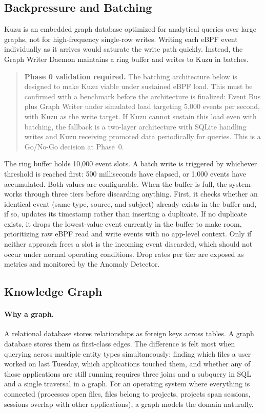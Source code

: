\subsection{Backpressure and Batching}
\label{sec:backpressure}

Kuzu is an embedded graph database optimized for analytical queries over large
graphs, not for high-frequency single-row writes. Writing each eBPF event
individually as it arrives would saturate the write path quickly. Instead, the
Graph Writer Daemon maintains a ring buffer and writes to Kuzu in batches.

\begin{quote}
\textbf{Phase 0 validation required.} The batching architecture below is
designed to make Kuzu viable under sustained eBPF load. This must be confirmed
with a benchmark before the architecture is finalized: Event Bus plus Graph
Writer under simulated load targeting 5,000 events per second, with Kuzu as
the write target. If Kuzu cannot sustain this load even with batching, the
fallback is a two-layer architecture with SQLite handling writes and Kuzu
receiving promoted data periodically for queries. This is a Go/No-Go decision
at Phase~0.
\end{quote}

The ring buffer holds 10,000 event slots. A batch write is triggered by
whichever threshold is reached first: 500 milliseconds have elapsed, or 1,000
events have accumulated. Both values are configurable. When the buffer is full,
the system works through three tiers before discarding anything. First, it
checks whether an identical event (same type, source, and subject) already
exists in the buffer and, if so, updates its timestamp rather than inserting a
duplicate. If no duplicate exists, it drops the lowest-value event currently in
the buffer to make room, prioritizing raw eBPF read and write events with no
app-level context. Only if neither approach frees a slot is the incoming event
discarded, which should not occur under normal operating conditions. Drop rates
per tier are exposed as metrics and monitored by the Anomaly Detector.

\subsection{Knowledge Graph}
\label{sec:knowledge-graph}

\paragraph{Why a graph.}
A relational database stores relationships as foreign keys across tables. A
graph database stores them as first-class edges. The difference is felt most
when querying across multiple entity types simultaneously: finding which files
a user worked on last Tuesday, which applications touched them, and whether any
of those applications are still running requires three joins and a subquery in
SQL and a single traversal in a graph. For an operating system where
everything is connected (processes open files, files belong to projects,
projects span sessions, sessions overlap with other applications), a graph
models the domain naturally.

